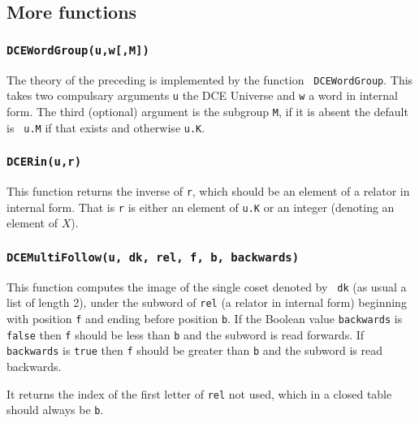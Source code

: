 \subsection{More functions}

\subsubsection{\tt DCEWordGroup(u,w[,M])}

The theory of the preceding is implemented by the function {\tt
DCEWordGroup}. This takes two compulsary arguments {\tt u} the DCE
Universe and {\tt w} a word in internal form. The third (optional)
argument is the subgroup {\tt M}, if it is absent the default is {\tt
u.M} if that exists and otherwise {\tt u.K}.

\subsubsection{\tt DCERin(u,r)}

This function returns the inverse of {\tt r}, which should be an
element of a relator in internal form. That is {\tt r} is either an
element of {\tt u.K} or an integer (denoting an element of $X$).

\subsubsection{\tt DCEMultiFollow(u, dk, rel, f, b, backwards)}

This function computes the image of the single coset denoted by {\tt
dk} (as usual a list of length 2), under the subword of {\tt rel} (a
relator in internal form) beginning with position {\tt f} and ending
before position {\tt b}. If the Boolean value {\tt backwards} is {\tt false}
then {\tt f} should be less than {\tt b} and the subword is read
forwards. If {\tt backwards} is {\tt true} then {\tt f} should be
greater than {\tt b} and the subword is read backwards.

It returns the index of the first letter of {\tt rel} not used, which
in a closed table should always be {\tt b}.











